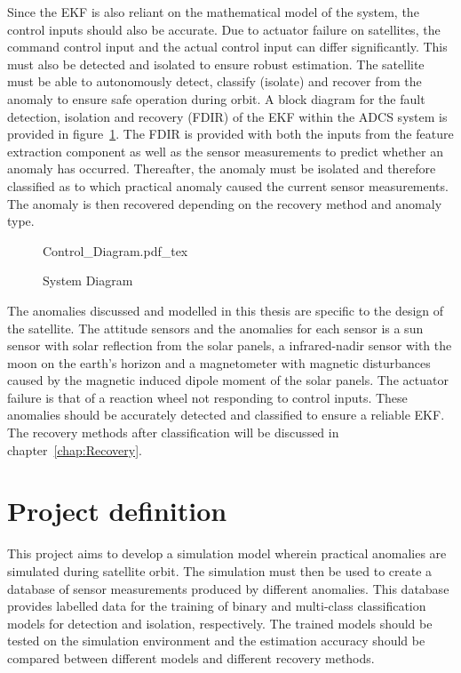 Since the EKF is also reliant on the mathematical model of the system, the control inputs should also be accurate. Due to actuator failure on satellites, the command control input and the actual control input can differ significantly. This must also be detected and isolated to ensure robust estimation. The satellite must be able to autonomously detect, classify (isolate) and recover from the anomaly to ensure safe operation during orbit. A block diagram for the fault detection, isolation and recovery (FDIR) of the EKF within the ADCS system is provided in figure~\ref{fig:System_Diagram}. The FDIR is provided with both the inputs from the feature extraction component as well as the sensor measurements to predict whether an anomaly has occurred. Thereafter, the anomaly must be isolated and therefore classified as to which practical anomaly caused the current sensor measurements. The anomaly is then recovered depending on the recovery method and anomaly type.

\begin{figure}[h!b!t]
	\centering
	\def\svgwidth{14cm}
	{Control_Diagram.pdf_tex}
	\caption{System Diagram}
	\label{fig:System_Diagram}
\end{figure}

The anomalies discussed and modelled in this thesis are specific to the design of the satellite. The attitude sensors and the anomalies for each sensor is a sun sensor with solar reflection from the solar panels, a infrared-nadir sensor with the moon on the earth's horizon and a magnetometer with magnetic disturbances caused by the magnetic induced dipole moment of the solar panels. The actuator failure is that of a reaction wheel not responding to control inputs. These anomalies should be accurately detected and classified to ensure a reliable EKF. The recovery methods after classification will be discussed in chapter~\ref{chap:Recovery}.

\section{Project definition}
This project aims to develop a simulation model wherein practical anomalies are simulated during satellite orbit. The simulation must then be used to create a database of sensor measurements produced by different anomalies. This database provides labelled data for the training of binary and multi-class classification models for detection and isolation, respectively. The trained models should be tested on the simulation environment and the estimation accuracy should be compared between different models and different recovery methods.

